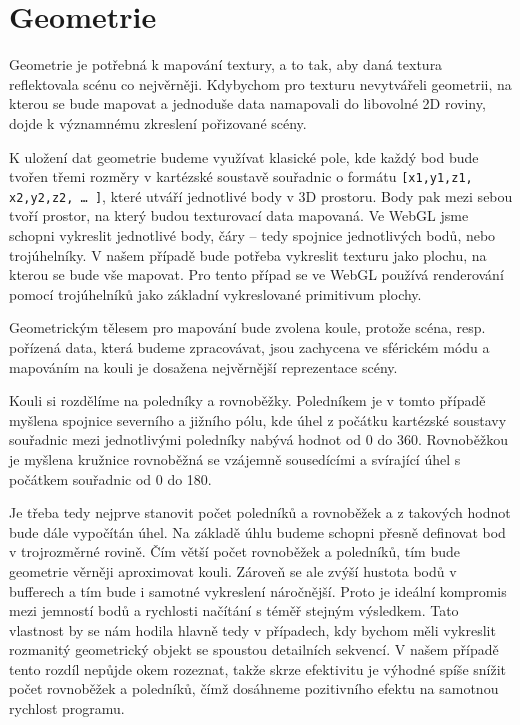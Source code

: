 \section{Geometrie}
Geometrie je potřebná k mapování textury, a to tak, aby daná textura reflektovala scénu co nejvěrněji. Kdybychom pro texturu nevytvářeli geometrii, na kterou se bude mapovat a jednoduše data namapovali do libovolné 2D roviny, dojde k významnému zkreslení pořizované scény.

K uložení dat geometrie budeme využívat klasické pole, kde každý bod bude tvořen třemi rozměry v kartézské soustavě souřadnic o formátu \texttt{[x1,y1,z1, x2,y2,z2, … ]}, které utváří jednotlivé body v 3D prostoru. Body pak mezi sebou tvoří prostor, na který budou texturovací data  mapovaná. Ve WebGL jsme schopni vykreslit jednotlivé body, čáry – tedy spojnice jednotlivých bodů, nebo trojúhelníky. V našem případě bude potřeba vykreslit texturu jako plochu, na kterou se bude vše mapovat. Pro tento případ se ve WebGL používá renderování pomocí trojúhelníků jako základní vykreslované primitivum plochy.

Geometrickým tělesem pro mapování bude zvolena koule, protože scéna, resp. pořízená data, která budeme zpracovávat, jsou zachycena ve sférickém módu a mapováním na kouli je dosažena nejvěrnější reprezentace scény.

Kouli si rozdělíme na poledníky a rovnoběžky. Poledníkem je v tomto případě myšlena spojnice severního a jižního pólu, kde úhel z počátku kartézské soustavy souřadnic mezi jednotlivými poledníky nabývá hodnot od 0 do 360\degree. Rovnoběžkou je myšlena kružnice  rovnoběžná se vzájemně sousedícími a svírající úhel s počátkem souřadnic od 0 do 180\degree. 

Je třeba tedy nejprve stanovit počet poledníků a rovnoběžek a z takových hodnot bude dále vypočítán úhel. Na základě úhlu budeme schopni přesně definovat bod v trojrozměrné rovině. Čím větší počet rovnoběžek a poledníků, tím bude geometrie věrněji aproximovat kouli. Zároveň se ale zvýší hustota bodů v bufferech a tím bude i samotné vykreslení náročnější. Proto je ideální kompromis mezi jemností bodů a rychlosti načítání s téměř stejným výsledkem. Tato vlastnost by se nám hodila hlavně tedy v případech, kdy bychom měli vykreslit rozmanitý geometrický objekt se spoustou detailních sekvencí. V našem případě tento rozdíl nepůjde okem rozeznat, takže skrze efektivitu je výhodné spíše snížit počet rovnoběžek a poledníků, čímž dosáhneme pozitivního efektu na samotnou rychlost programu.


